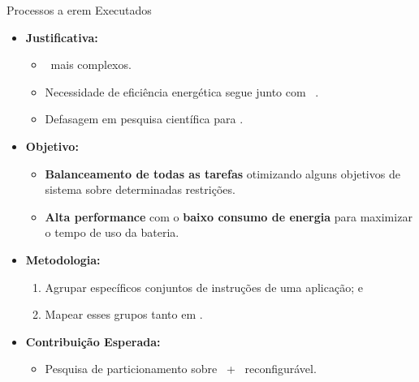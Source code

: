       \begin{frame}{Processos a erem Executados} \vspace{-1em}
         \begin{itemize} \setlength{\itemsep}{1.0em}
            \item \textbf{Justificativa:}
            \begin{itemize} \setlength{\itemsep}{0.3em}
               \item \Designs\ mais complexos.
               
               \item Necessidade de eficiência energética segue junto com \speedup\ \cite{Trindade2016, Arato2005, Yan2017}.
               
               \item Defasagem em pesquisa científica para \wearables.
               
            \end{itemize}
         
            \item \textbf{Objetivo:} 
            \begin{itemize} \setlength{\itemsep}{0.3em}
               \item \textbf{Balanceamento de todas as tarefas} otimizando alguns objetivos de sistema sobre determinadas restrições.
               
               \item \textbf{Alta performance} com o \textbf{baixo consumo de energia} para maximizar o tempo de uso da bateria.
            \end{itemize}
            \item \textbf{Metodologia:} 
            \begin{enumerate} \setlength{\itemsep}{0.3em}
               \item Agrupar específicos conjuntos de instruções de uma aplicação; e
               \item Mapear esses grupos tanto em \hs.
            \end{enumerate}
         
            \item \textbf{Contribuição Esperada:} 
            \begin{itemize} \setlength{\itemsep}{0.3em}
               \item Pesquisa de particionamento sobre \wearables\ + \hardware\ reconfigurável.
            \end{itemize}
         \end{itemize}
      \end{frame}
